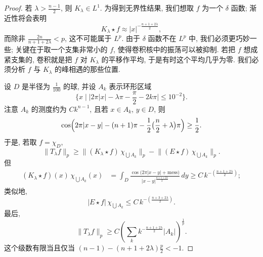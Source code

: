\begin{proof}
若 $\lambda>\frac{n-1}{2}$, 则 $K_\lambda\in L^1$. 为得到无界性结果, 我们想取 $f$ 为一个 $\delta$ 函数; 渐近性将会表明
\[
K_{\lambda}\star f\approx|x|^{-\frac{n+1+2\lambda}{2}},
\]
而除非 $\frac{2n}{n+1+2\lambda}<p$, 这不可能属于 $L^p$. 由于 $\delta$ 函数不在 $L^p$ 中, 我们必须更巧妙一些; 关键在于取一个支集非常小的 $f$, 使得卷积核中的振荡可以被抑制. 若把 $f$ 想成紧支集的, 卷积就是把 $f$ 对 $K_\lambda$ 的平移作平均, 于是有时这个平均几乎为零. 我们必须分析 $f$ 与 $K_\lambda$ 的峰相遇的那些位置.

设 $D$ 是半径为 $\frac{1}{100}$ 的球, 并设 $A_{k}$ 表示环形区域
\[
\{x \mid \bigl|2\pi|x|-\lambda\pi-\frac{\pi}{2}-2k\pi\bigr|\leq 10^{-2}\}.
\]
注意 $A_{k}$ 的测度约为 $Ck^{n-1}$, 且若 $x\in A_{k}$, $y\in D$, 则
\[
\cos\Bigl(2\pi|x-y|-(n+1)\pi-\frac{1}{2}\bigl(\frac{n}{2}+\lambda\bigr)\pi\Bigr)\geq\frac{1}{2}.
\]
于是, 若取 $f=\chi_{D}$,
\[
\|T_{\lambda}f\|_{p}\geq\bigl\|(K_{\lambda}\star f)\,\chi_{\bigcup A_{k}}\bigr\|_{p}
-\bigl\|(E\star f)\,\chi_{\bigcup A_{k}}\bigr\|_{p}.
\]
但
\begin{align*}
(K_{\lambda}\star f)(x)\,\chi_{\bigcup A_{k}}(x)
&=\int_{D}\frac{\cos\bigl(2\pi|x-y|+\mathrm{mess}\bigr)}{|x-y|^{\frac{n+1+2\lambda}{2}}}\,dy
\geq C\,k^{-(\frac{n+1+2\lambda}{2})};
\end{align*}
类似地,
\[
|E\star f|\,\chi_{\bigcup A_{k}}\leq C\,k^{-(\frac{n+3+2\lambda}{2})}.
\]
最后,
\[
\|T_{\lambda}f\|_{p}\geq C\left(\sum_{k}k^{-\frac{n+1+2\lambda}{2}}|A_{k}|\right)^{\frac{1}{p}}.
\]
这个级数有限当且仅当 $(n-1)-(n+1+2\lambda)\frac{p}{2}<-1$.
\end{proof}

